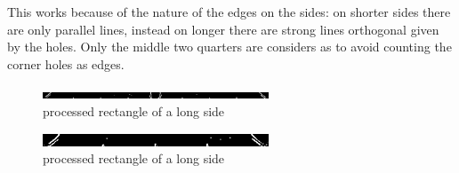 This works because of the nature of the edges on the sides: on shorter sides there
are only parallel lines, instead on longer there are strong lines orthogonal given by the holes.
Only the middle two quarters are considers as to avoid counting the corner holes as edges.
\begin{figure}
\includegraphics[width=0.6\textwidth]{./imgs/sobel_long_side.png}
\caption{processed rectangle of a long side}
\end{figure}
\begin{figure}
\includegraphics[width=0.6\textwidth]{./imgs/sobel_short_side.png}
\caption{processed rectangle of a long side}
\end{figure}
